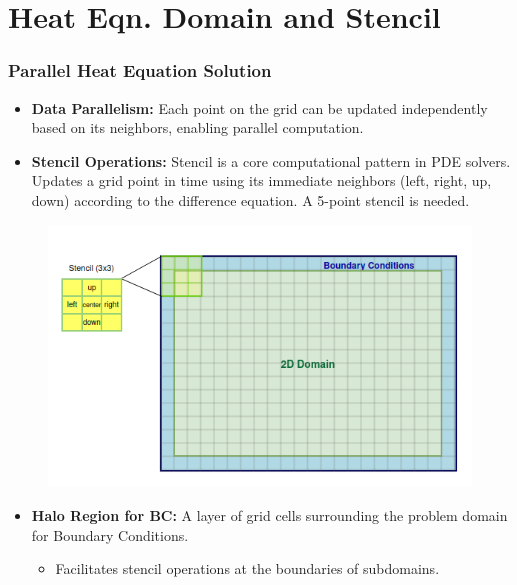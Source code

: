 \documentclass[9pt]{beamer}
\begin{document}
\section{Heat Eqn. Domain and Stencil}
\begin{frame}
\frametitle{Parallel Heat Equation Solution}
\vspace{-0.5\baselineskip}
\scriptsize
    \begin{itemize}
        \item \textbf{Data Parallelism:} Each point on the grid can be updated independently based on its neighbors, enabling parallel computation.
        \item \textbf{Stencil Operations:} Stencil is a core computational pattern in PDE solvers. Updates a grid point in time using its immediate neighbors (left, right, up, down) according to the difference equation. A 5-point stencil is needed.
    \end{itemize}
    \vspace{-0.5\baselineskip}
    \begin{figure}
        \centering
        \includegraphics[width=0.6\linewidth]{Screenshot from 2024-08-30 14-18-30.png}
        \label{fig:enter-label}
    \end{figure}
    \begin{itemize}
        \item \textbf{Halo Region for BC:} A layer of grid cells surrounding the problem domain for Boundary Conditions.
        \begin{itemize}
            \item Facilitates stencil operations at the boundaries of subdomains.
        \end{itemize}
    \end{itemize}
\end{frame}
\end{document}
